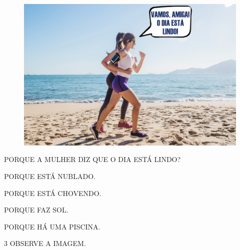 \begin{figure}[H]
\centering
\includegraphics[width=\textwidth]{media/image175a.jpg}
\end{figure}

PORQUE A MULHER DIZ QUE O DIA ESTÁ LINDO? 

\begin{escolha}%
\item PORQUE ESTÁ NUBLADO.

\item PORQUE ESTÁ CHOVENDO.

\item PORQUE FAZ SOL.

\item  PORQUE HÁ UMA PISCINA.
\end{escolha}


\num{3} OBSERVE A IMAGEM.

